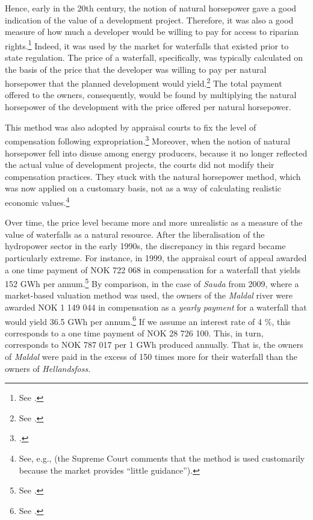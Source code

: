 Hence, early in the 20th century, the notion of natural horsepower gave a good indication of the value of a development project. Therefore, it was also a good measure of how much a developer would be willing to pay for access to riparian rights.\footnote{See \cite[83]{uleberg08}.} Indeed, it was used by the market for waterfalls that existed prior to state regulation. The price of a waterfall, specifically, was typically calculated on the basis of the price that the developer was willing to pay per natural horsepower that the planned development would yield.\footnote{See \cite[83]{uleberg08}.} The total payment offered to the owners, consequently, would be found by multiplying the natural horsepower of the development with the price offered per natural horsepower.

This method was also adopted by appraisal courts to fix the level of compensation following expropriation.\footnote{\cite[521]{vislie02}.} Moreover, when the notion of natural horsepower fell into disuse among energy producers, because it no longer reflected the actual value of development projects, the courts did not modify their compensation practices. They stuck with the natural horsepower method, which was now applied on a customary basis, not as a way of calculating realistic economic values.\footnote{See, e.g., \cite[1599]{hellandsfoss99} (the Supreme Court comments that the method is used customarily because the market provides ``little guidance'').}

Over time, the price level became more and more unrealistic as a measure of the value of waterfalls as a natural resource. After the liberalisation of the hydropower sector in the early 1990s, the discrepancy in this regard became particularly extreme. For instance, in 1999, the appraisal court of appeal awarded a one time payment of NOK 722 068 in compensation for a waterfall that yields 152 GWh per annum.\footnote{See \cite{hellandsfoss99}.} By comparison, in the case of {\it Sauda} from 2009, where a market-based valuation method was used, the owners of the {\it Maldal} river were awarded NOK 1 149 044 in compensation as a {\it yearly payment} for a waterfall that would yield 36.5 GWh per annum.\footnote{See \cite{sauda09}.} If we assume an interest rate of 4 \%, this corresponds to a one time payment of NOK 28 726 100. This, in turn, corresponds to NOK 787 017 per 1 GWh produced annually. That is, the owners of {\it Maldal} were paid in the excess of 150 times more for their waterfall than the owners of {\it Hellandsfoss}.

